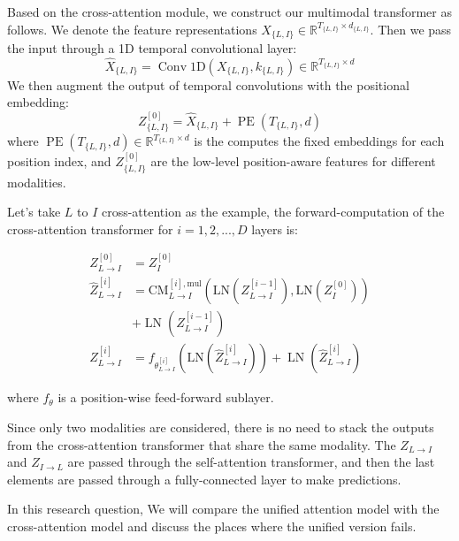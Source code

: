 \documentclass[nohyperref]{article}
\theoremstyle{plain}
\theoremstyle{definition}
\theoremstyle{remark}
\begin{document}
Based on the cross-attention module, we construct our multimodal transformer as follows. We denote the feature representations $X_{\{L, I\}} \in \mathbb{R}^{T_{\{L, I\}} \times d_{\{L, I\}}}$. Then we pass the input through a 1D temporal convolutional layer:
\begin{equation}
\hat{X}_{\{L, I\}}=\operatorname{Conv} 1 \mathrm{D}\left(X_{\{L, I\}}, k_{\{L, I\}}\right) \in \mathbb{R}^{T_{\{L, I\}} \times d}
\end{equation}
We then augment the output of temporal convolutions with the positional embedding: 
\begin{equation}
Z_{\{L, I\}}^{[0]}=\hat{X}_{\{L, I\}}+\operatorname{PE}\left(T_{\{L, I\}}, d\right)
\end{equation}
where $\operatorname{PE}\left(T_{\{L, I\}}, d\right) \in \mathbb{R}^{T_{\{L, I\}} \times d}$ is the computes the fixed embeddings for each position index, and $Z_{\{L, I\}}^{[0]}$ are the low-level position-aware features for different modalities. 

Let's take $L$ to $I$ cross-attention as the example, the forward-computation of the cross-attention transformer for $i=1,2,..., D$ layers is:


\begin{align*}
Z_{L \rightarrow I}^{[0]} &= Z_I^{[0]} \\
\hat{Z}_{L \rightarrow I}^{[i]} &= \mathrm{CM}_{L \rightarrow I}^{[i], \mathrm{mul}}\left(\mathrm{LN}\left(Z_{L \rightarrow I}^{[i-1]}\right), \mathrm{LN}\left(Z_I^{[0]}\right)\right) \\
&+ \operatorname{LN}\left(Z_{L \rightarrow I}^{[i-1]}\right) \\
Z_{L \rightarrow I}^{[i]} &= f_{\theta_{L \rightarrow I}^{[i]}}\left(\mathrm{LN}\left(\hat{Z}_{L \rightarrow I}^{[i]}\right)\right)+\operatorname{LN}\left(\hat{Z}_{L \rightarrow I}^{[i]}\right)
\end{align*}

where $f_\theta$ is a position-wise feed-forward sublayer. 

Since only two modalities are considered, there is no need to stack the outputs from the cross-attention transformer that share the same modality. The $Z_{L\rightarrow I}$ and $Z_{I\rightarrow L}$ are passed through the self-attention transformer, and then the last elements are passed through a fully-connected layer to make predictions.

In this research question, We will compare the unified attention model with the cross-attention model and discuss the places where the unified version fails.
\end{document}
